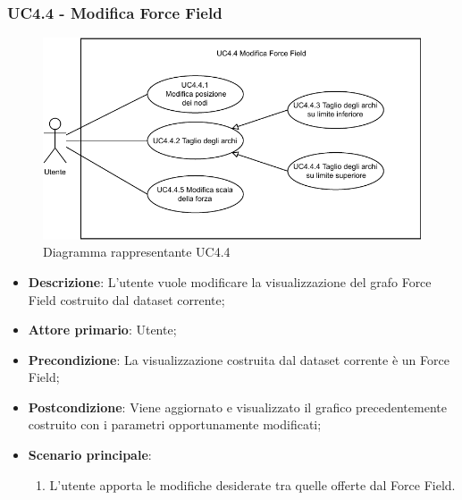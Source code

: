 \newpage
\subsubsection{UC4.4 - Modifica Force Field}
\label{ssub:uc4.4}
\begin{figure}[h]
    \centering
    \includegraphics[width=0.6  \textwidth]{componenti/casi-duso/diagrammi/UC4_4.pdf}
    \caption{Diagramma rappresentante UC4.4}
    \label{fig:UC4.4}
\end{figure}


\begin{itemize}
    \item \textbf{Descrizione}: L’utente vuole modificare la visualizzazione del grafo Force Field
                                costruito dal dataset corrente;

    \item \textbf{Attore primario}: Utente;

    \item \textbf{Precondizione}:   La visualizzazione costruita dal dataset corrente è un Force Field;

    \item \textbf{Postcondizione}:  Viene aggiornato e visualizzato il grafico precedentemente costruito con i parametri opportunamente modificati;

    \item \textbf{Scenario principale}: 
    \begin{enumerate}
        \item L'utente apporta le modifiche desiderate tra quelle offerte dal Force Field.
    \end{enumerate}
\end{itemize}


